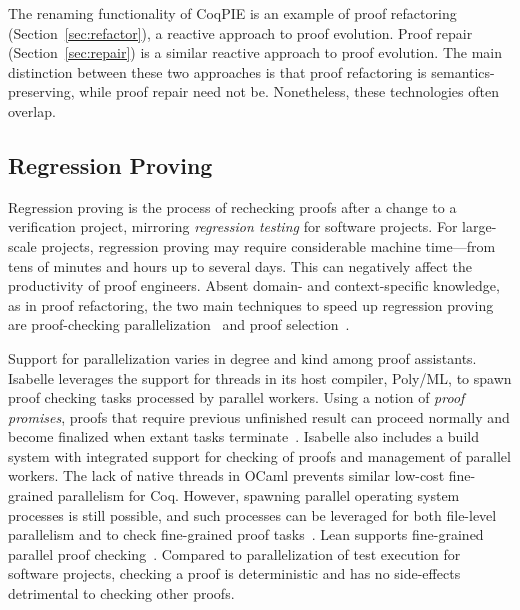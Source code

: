 The renaming functionality of CoqPIE is an example of proof refactoring (Section~\ref{sec:refactor}),
a reactive approach to proof evolution. Proof repair (Section~\ref{sec:repair})
is a similar reactive approach to proof evolution. The main distinction between these two approaches 
is that proof refactoring is semantics-preserving, while proof repair need not be. 
Nonetheless, these technologies often overlap.

\subsection{Regression Proving}
\label{sec:regression}

Regression proving is the process of rechecking proofs after a change to a verification project, mirroring \emph{regression testing} for software projects. For large-scale projects, regression proving may require considerable machine time---from tens of minutes and hours up to several days. This can negatively affect the productivity of proof engineers. Absent domain- and context-specific knowledge, as in proof refactoring, the two main techniques to speed up regression proving are proof-checking parallelization~\citep{Wenzel2013MultiProcessing,Barras2013} and proof selection~\citep{Celik2017}.

Support for parallelization varies in degree and kind among proof assistants. Isabelle leverages the support for threads in its host compiler, Poly/ML, to spawn proof checking tasks processed by parallel workers. Using a notion of \emph{proof promises}, proofs that require previous unfinished result can proceed normally and become finalized when extant tasks terminate~\citep{Wenzel2013}. Isabelle also includes a build system with integrated support for checking of proofs and management of parallel workers. The lack of native threads in OCaml prevents similar low-cost fine-grained parallelism for Coq. However, spawning parallel operating system processes is still possible, and such processes can be leveraged for both file-level parallelism and to check fine-grained proof tasks~\citep{Barras2015}. Lean supports fine-grained parallel proof checking~\citep{deMoura2015}. Compared to parallelization of test execution for software projects, checking a proof is deterministic and has no side-effects detrimental to checking other proofs. 

